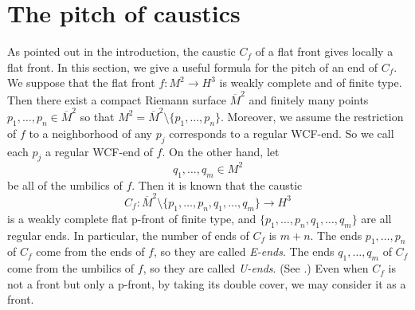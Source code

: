 \documentclass[a4paper]{amsart}
\theoremstyle{plain}
\theoremstyle{remark}
\numberwithin{equation}{section}
\begin{document}
\section{The pitch of caustics}
\label{sec:example}
As pointed out in the introduction,
the caustic $C_f$ of a flat front gives locally a flat front.
In this section, we give a useful formula for the 
pitch of an end of $C_f$.
We suppose that the flat front 
$f\colon M^2\to H^3$ 
is weakly complete and of finite type.
Then there exist a compact Riemann surface 
$\overline{M}^2$ and finitely many points $p_1,\dots,p_n \in 
\overline{M}^2$ 
so that $M^2 = \overline{M}^2 \setminus \{ p_1,\dots,p_n \}$.  
Moreover, we assume the 
 restriction of $f$ to a neighborhood of any $p_j$
corresponds to a regular WCF-end.
So we call each $p_j$ a regular WCF-end of $f$.
On the other hand, let
\[
     q_1,\dots,q_m\in M^2
\]
be all of the umbilics of $f$.
Then it is known that the caustic 
\[
   C_f: \overline{M}^2 \setminus \{p_1,\dots,p_n,q_1,\dots,q_m\}
   \longrightarrow H^3
\]
is a weakly complete flat p-front of finite type, and
$\{p_1,\dots,p_n,q_1,\dots,q_m\}$ are all regular ends.
In particular, the number of ends of $C_f$ is $m+n$.
The ends $p_1,\dots,p_n$ of $C_f$ come from the ends
of $f$, so they are called {\it E-ends\/}.
The ends $q_1,\dots,q_m$ of $C_f$ come from the umbilics
of $f$, so they are called {\it U-ends\/}. (See \cite{KRUY}.)
Even when $C_f$ is not a front but only a p-front, 
by taking its double cover, we may consider it as a front.
\end{document}
